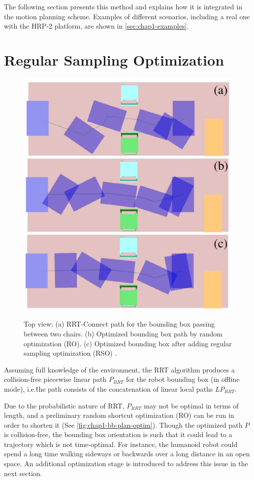 The following section presents this method and explains how it is
integrated in the motion planning scheme. Examples of different
scenarios, including a real one with the HRP-2 platform, are shown in
\autoref{sec:chap1-examples}.

\section{Regular Sampling Optimization}
\label{sec:chap1-regular-sampling-optim}

\begin{figure}
  \centering
      {\includegraphics[width = 0.8\linewidth]
        {src/chap1-path-optimization/bb-plan-optim.pdf}}
      \caption{Top view: (a) RRT-Connect path for the bounding box
        passing between two chairs. (b) Optimized bounding box path by
        random optimization (RO). (c) Optimized bounding box after
        adding regular sampling optimization (RSO) .}
      \label{fig:chap1-bb-plan-optim}
\end{figure}

Assuming full knowledge of the environment, the RRT algorithm produces
a collision-free piecewise linear path $P_{RRT}$ for the robot
bounding box (in offline mode), i.e.\~the path consists of the
concatenation of linear local paths $LP_{RRT}$.

Due to the probabilistic nature of RRT, $P_{RRT}$ may not be optimal
in terms of length, and a preliminary random shortcut optimization
(RO) can be run in order to shorten it (See
\autoref{fig:chap1-bb-plan-optim}). Though the optimized path $P$ is
collision-free, the bounding box orientation is such that it could
lead to a trajectory which is not time-optimal. For instance, the
humanoid robot could spend a long time walking sideways or backwards
over a long distance in an open space. An additional optimization
stage is introduced to address this issue in the next section.

